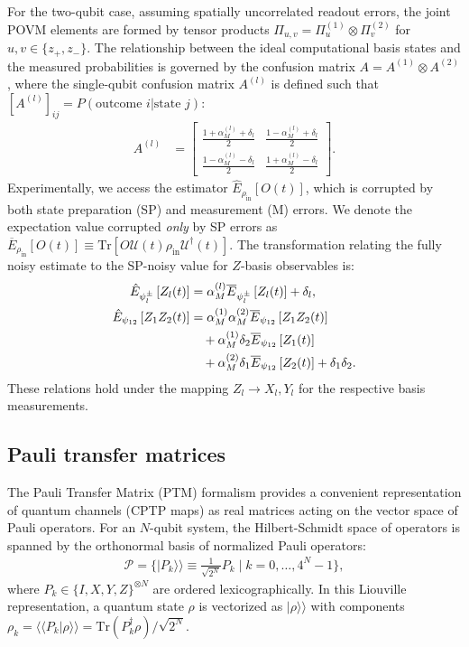 \documentclass[%
 reprint,
superscriptaddress,
 amsmath,amssymb,
 aps,
pra,
]{revtex4-2}
\begin{document}
For the two-qubit case, assuming spatially uncorrelated readout errors, the joint POVM elements are formed by tensor products $\Pi_{u,v}=\Pi_u^{(1)}\otimes\Pi_v^{(2)}$ for $u,v\in\{z_+,z_-\}$. The relationship between the ideal computational basis states and the measured probabilities is governed by the confusion matrix $A = A^{(1)} \otimes A^{(2)}$, where the single-qubit confusion matrix $A^{(l)}$ is defined such that $[A^{(l)}]_{ij} = P(\text{outcome } i | \text{state } j)$:
\begin{align}
    A^{(l)}&=\begin{bmatrix}
        \frac{1+\alpha_M^{(l)}+\delta_l}{2} & \frac{1-\alpha_M^{(l)}+\delta_l}{2}\\
        \frac{1-\alpha_M^{(l)}-\delta_l}{2} & \frac{1+\alpha_M^{(l)}-\delta_l}{2}
    \end{bmatrix}.
\end{align}
Experimentally, we access the estimator $\hat{E}_{\rho_{\text{in}}}[O(t)]$, which is corrupted by both state preparation (SP) and measurement (M) errors. We denote the expectation value corrupted \textit{only} by SP errors as $\overline{E}_{\rho_{\text{in}}}[O(t)] \equiv \text{Tr}[O \mathcal{U}(t)\rho_{\text{in}}\mathcal{U}^\dagger(t)]$. The transformation relating the fully noisy estimate to the SP-noisy value for $Z$-basis observables is:
\begin{align}
    \hat{E}_{\psi^\pm_l}\left[Z_l(t)\right]&=\alpha^{(l)}_M\overline{E}_{\psi^\pm_l}\left[Z_l(t)\right]+\delta_l,\\
    \hat{E}_{\psi_{12}}\left[Z_1Z_2(t)\right]&=\alpha_M^{(1)}\alpha_M^{(2)}\overline{E}_{\psi_{12}}\left[Z_1Z_2(t)\right]\notag\\
    &\quad+\alpha_M^{(1)}\delta_2\overline{E}_{\psi_{12}}\left[Z_1(t)\right]\notag\\
    &\quad+\alpha_M^{(2)}\delta_1\overline{E}_{\psi_{12}}\left[Z_2(t)\right]+\delta_1\delta_2.
\end{align}
These relations hold under the mapping $Z_l \to X_l, Y_l$ for the respective basis measurements.

\subsection{Pauli transfer matrices} 
The Pauli Transfer Matrix (PTM) formalism provides a convenient representation of quantum channels (CPTP maps) as real matrices acting on the vector space of Pauli operators. For an $N$-qubit system, the Hilbert-Schmidt space of operators is spanned by the orthonormal basis of normalized Pauli operators:
\begin{align}
    \mathcal{P} = \{|P_k\rangle\rangle \equiv \frac{1}{\sqrt{2^N}} P_k \mid k=0,\dots,4^N-1\},
\end{align}
where $P_k \in \{I, X, Y, Z\}^{\otimes N}$ are ordered lexicographically. In this Liouville representation, a quantum state $\rho$ is vectorized as $|\rho\rangle\rangle$ with components $\rho_k = \langle\langle P_k | \rho \rangle\rangle = \text{Tr}(P_k^\dagger \rho)/\sqrt{2^N}$.
\end{document}
